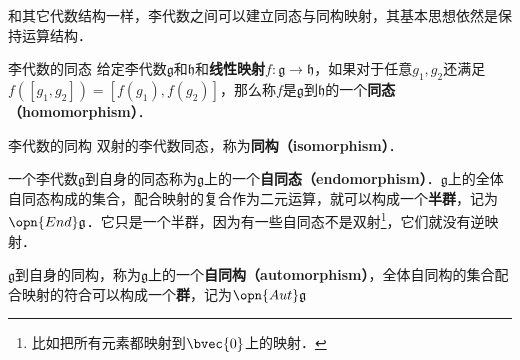 

和其它代数结构一样，李代数之间可以建立同态与同构映射，其基本思想依然是保持运算结构．

\begin{definition}{李代数的同态}
给定李代数$\mathfrak{g}$和$\mathfrak{h}$和\textbf{线性映射}$f:\mathfrak{g}\to\mathfrak{h}$，如果对于任意$g_1, g_2$还满足$f([g_1, g_2])=[f(g_1), f(g_2)]$，那么称$f$是$\mathfrak{g}$到$\mathfrak{h}$的一个\textbf{同态（homomorphism）}．
\end{definition}

\begin{definition}{李代数的同构}
双射的李代数同态，称为\textbf{同构（isomorphism）}．
\end{definition}

一个李代数$\mathfrak{g}$到自身的同态称为$\mathfrak{g}$上的一个\textbf{自同态（endomorphism）}．$\mathfrak{g}$上的全体自同态构成的集合，配合映射的复合作为二元运算，就可以构成一个\textbf{半群}，记为$\opn{End}\mathfrak{g}$．它只是一个半群，因为有一些自同态不是双射\footnote{比如把所有元素都映射到$\bvec{0}$上的映射．}，它们就没有逆映射．

$\mathfrak{g}$到自身的同构，称为$\mathfrak{g}$上的一个\textbf{自同构（automorphism）}，全体自同构的集合配合映射的符合可以构成一个\textbf{群}，记为$\opn{Aut}\mathfrak{g}$











